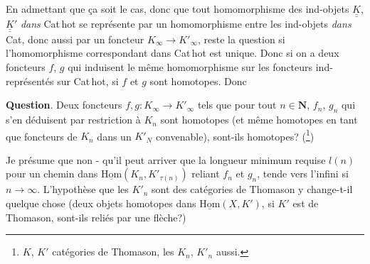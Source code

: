 \documentclass[11pt]{article}
\newcommand{\printedpage}[1]{\marginpar{\footnotesize p.~#1}}
\newcommand{\msp}[1]{\marginpar{\footnotesize [#1]}}
\newcommand{\uHom}{\underline{\mathrm{Hom}}}
\newcommand{\uuK}{\underline{\underline{K}}}
\begin{document}
En admettant que ça soit le cas, donc que tout homomorphisme des ind-objets $\uuK$, $\uuK'$ \textit{dans} Cat\,hot se représente par un homomorphisme entre les ind-objets \textit{dans} Cat, donc aussi par un foncteur $K_\infty \longrightarrow K'_\infty$, reste la question si l'homomorphisme correspondant dans Cat\,hot est unique. Donc si on a deux foncteurs $f$, $g$ qui induisent le même homomorphisme sur les foncteurs ind-représentés sur Cat\,hot, si $f$ et $g$ sont homotopes. Donc

\textbf{Question}. Deux foncteurs $f, g : K_\infty \longrightarrow K'_\infty$ tels que pour tout $n \in \mathbf{N}$, $f_n$, $g_n$ qui s'en déduisent par restriction à $K_n$ sont homotopes (et même homotopes en tant que foncteurs de $K_n$ dans un $K'_N$ convenable), sont-ils homotopes? (\footnote[8]{$K$, $K'$ catégories de Thomason, les $K_n$, $K'_n$ aussi.})

\printedpage{31}
\msp{page 49}
Je présume que non - qu'il peut arriver que la longueur minimum requise $l(n)$ pour un chemin dans $\uHom(K_n, K'_{\tau(n)})$ reliant $f_n$ et $g_n$, tende vers l'infini si $n \longrightarrow \infty$. L'hypothèse que les $K'_n$ sont des catégories de Thomason y change-t-il quelque chose (deux objets homotopes dans $\uHom(X, K')$, si $K'$ est de Thomason, sont-ils reliés par une flèche?)
\end{document}
